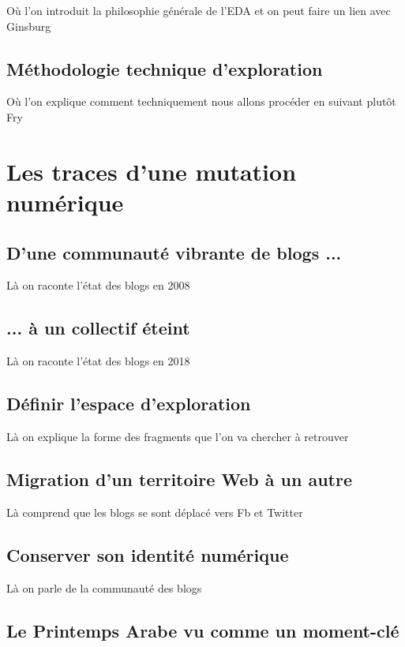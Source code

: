 \documentclass{tufte-book}
\begin{document}
Où l'on introduit la philosophie générale de l'EDA et on peut faire un lien avec Ginsburg

\subsection{Méthodologie technique d'exploration}

Où l'on explique comment techniquement nous allons procéder en suivant plutôt Fry

\section{Les traces d'une mutation numérique}

\subsection{D'une communauté vibrante de blogs ...}

Là on raconte l'état des blogs en 2008

\subsection{... à un collectif éteint}

Là on raconte l'état des blogs en 2018

\subsection{Définir l'espace d'exploration}

Là on explique la forme des fragments que l'on va chercher à retrouver

\subsection{Migration d'un territoire Web à un autre}

Là comprend que les blogs se sont déplacé vers Fb et Twitter

\subsection{Conserver son identité numérique}

Là on parle de la communauté des blogs

\subsection{Le Printemps Arabe vu comme un moment-clé}
\end{document}
